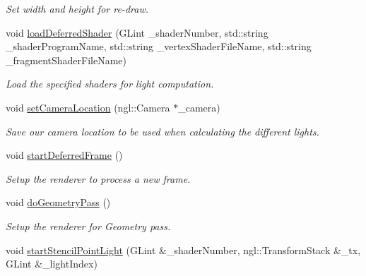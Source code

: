 \begin{DoxyCompactItemize}
\begin{DoxyCompactList}\small\item\em Set width and height for re-\/draw. \end{DoxyCompactList}\item 
void \hyperlink{class_deferred_shading_ae61c4970e594173bfe657b8e072cf056}{load\-Deferred\-Shader} (G\-Lint \-\_\-shader\-Number, std\-::string \-\_\-shader\-Program\-Name, std\-::string \-\_\-vertex\-Shader\-File\-Name, std\-::string \-\_\-fragment\-Shader\-File\-Name)
\begin{DoxyCompactList}\small\item\em Load the specified shaders for light computation. \end{DoxyCompactList}\item 
\hypertarget{class_deferred_shading_a6da63e5d421410d9f6a340bba0f9f051}{void \hyperlink{class_deferred_shading_a6da63e5d421410d9f6a340bba0f9f051}{set\-Camera\-Location} (ngl\-::\-Camera $\ast$\-\_\-camera)}\label{class_deferred_shading_a6da63e5d421410d9f6a340bba0f9f051}

\begin{DoxyCompactList}\small\item\em Save our camera location to be used when calculating the different lights. \end{DoxyCompactList}\item 
\hypertarget{class_deferred_shading_a4c11b2929a2b9497ef3e69645e4c887e}{void \hyperlink{class_deferred_shading_a4c11b2929a2b9497ef3e69645e4c887e}{start\-Deferred\-Frame} ()}\label{class_deferred_shading_a4c11b2929a2b9497ef3e69645e4c887e}

\begin{DoxyCompactList}\small\item\em Setup the renderer to process a new frame. \end{DoxyCompactList}\item 
\hypertarget{class_deferred_shading_a9cc19ee2fb7f38e86481b75963cf74cc}{void \hyperlink{class_deferred_shading_a9cc19ee2fb7f38e86481b75963cf74cc}{do\-Geometry\-Pass} ()}\label{class_deferred_shading_a9cc19ee2fb7f38e86481b75963cf74cc}

\begin{DoxyCompactList}\small\item\em Setup the renderer for Geometry pass. \end{DoxyCompactList}\item 
\hypertarget{class_deferred_shading_a4424578aceef5203ad155fc405fd24ef}{void \hyperlink{class_deferred_shading_a4424578aceef5203ad155fc405fd24ef}{start\-Stencil\-Point\-Light} (G\-Lint \&\-\_\-shader\-Number, ngl\-::\-Transform\-Stack \&\-\_\-tx, G\-Lint \&\-\_\-light\-Index)}\label{class_deferred_shading_a4424578aceef5203ad155fc405fd24ef}


\end{DoxyCompactItemize}
